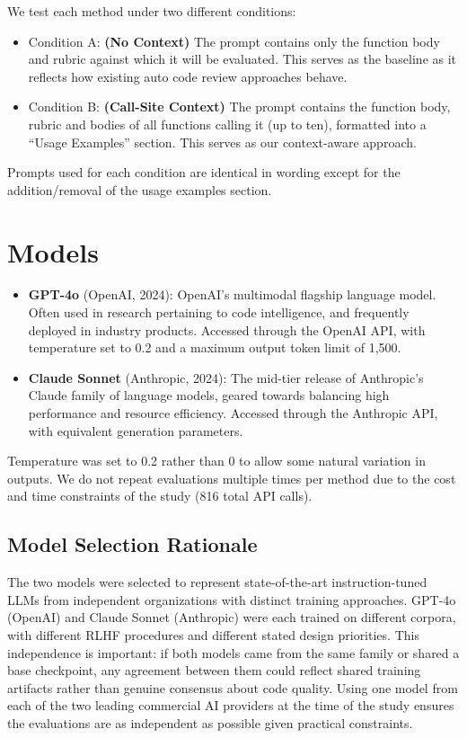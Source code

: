 \documentclass[12pt]{report}
\begin{document}
We test each method under two different conditions:

\begin{itemize} 
\item Condition A: \textbf{(No Context)} The prompt contains only the function body and rubric against which it will be evaluated. This serves as the baseline as it reflects how existing auto code review approaches behave.
\item Condition B: \textbf{(Call-Site Context)} The prompt contains the function body, rubric and bodies of all functions calling it (up to ten), formatted into a ``Usage Examples'' section. This serves as our context-aware approach. 
\end{itemize} 

Prompts used for each condition are identical in wording except for the addition/removal of the usage examples section.

\section{Models}

\begin{itemize}
\item \textbf{GPT-4o} (OpenAI, 2024): OpenAI's multimodal flagship language model. Often used in research pertaining to code intelligence, and frequently deployed in industry products. Accessed through the OpenAI API, with temperature set to 0.2 and a maximum output token limit of 1,500.
\item \textbf{Claude Sonnet} (Anthropic, 2024): The mid-tier release of Anthropic's Claude family of language models, geared towards balancing high performance and resource efficiency. Accessed through the Anthropic API, with equivalent generation parameters.
\end{itemize}


Temperature was set to 0.2 rather than 0 to allow some natural variation in outputs. We do not repeat evaluations multiple times per method due to the cost and time constraints of the study (816 total API calls).

\subsection{Model Selection Rationale}

The two models were selected to represent state-of-the-art instruction-tuned LLMs from independent organizations with distinct training approaches. GPT-4o (OpenAI) and Claude Sonnet (Anthropic) were each trained on different corpora, with different RLHF procedures and different stated design priorities. This independence is important: if both models came from the same family or shared a base checkpoint, any agreement between them could reflect shared training artifacts rather than genuine consensus about code quality. Using one model from each of the two leading commercial AI providers at the time of the study ensures the evaluations are as independent as possible given practical constraints.
\end{document}
